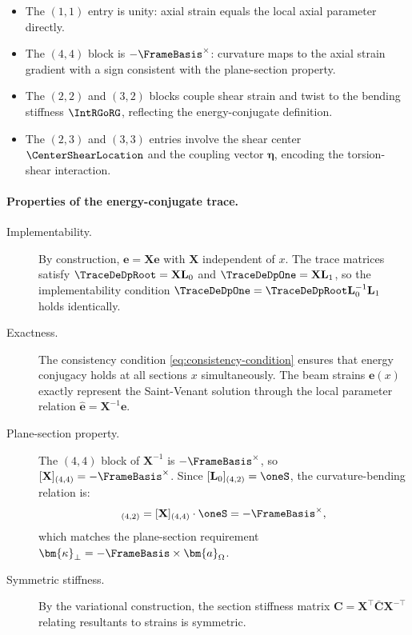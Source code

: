 \begin{itemize}
\item The $(1,1)$ entry is unity: axial strain equals the local axial parameter directly.

\item The $(4,4)$ block is $-\FrameBasis^\times$: curvature maps to the 
axial strain gradient with a sign consistent with the plane-section property.

\item The $(2,2)$ and $(3,2)$ blocks couple shear strain and twist to 
the bending stiffness $\IntRGoRG$, reflecting the energy-conjugate definition.

\item The $(2,3)$ and $(3,3)$ entries involve the shear center 
$\CenterShearLocation$ and the coupling vector $\bm{\eta}$, encoding 
the torsion-shear interaction.
\end{itemize}

\paragraph{Properties of the energy-conjugate trace.}

\begin{description}
\item[Implementability.] 
By construction, $\bm{e} = \mathbf{X}\hat{\bm{e}}$ with $\mathbf{X}$ independent of $x$. 
The trace matrices satisfy $\TraceDeDpRoot = \mathbf{X}\mathbf{L}_0$ and 
$\TraceDeDpOne = \mathbf{X}\mathbf{L}_1$, so the implementability condition 
$\TraceDeDpOne = \TraceDeDpRoot\mathbf{L}_0^{-1}\mathbf{L}_1$ holds identically.

\item[Exactness.] 
The consistency condition \eqref{eq:consistency-condition} ensures that 
energy conjugacy holds at all sections $x$ simultaneously. The beam strains 
$\bm{e}(x)$ exactly represent the Saint-Venant solution through the local 
parameter relation $\hat{\bm{e}} = \mathbf{X}^{-1}\bm{e}$.

\item[Plane-section property.] 
The $(4,4)$ block of $\mathbf{X}^{-1}$ is $-\FrameBasis^\times$, so 
$[\mathbf{X}]_{(4,4)} = -\FrameBasis^\times$. Since 
$[\mathbf{L}_0]_{(4,2)} = \oneS$, the curvature-bending relation is:
\begin{equation}
[\TraceDeDpRoot]_{(4,2)} = [\mathbf{X}]_{(4,4)} \cdot \oneS = -\FrameBasis^\times,
\end{equation}
which matches the plane-section requirement 
$\bm{\kappa}_\perp = -\FrameBasis \times \bm{a}_\Omega$.

\item[Symmetric stiffness.] 
By the variational construction, the section stiffness matrix 
$\mathbf{C} = \mathbf{X}^\top \bar{\mathbf{C}} \mathbf{X}^{-\top}$ relating 
resultants to strains is symmetric.
\end{description}

